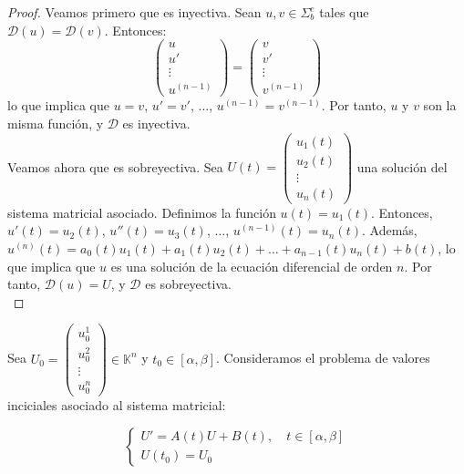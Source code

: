 \begin{proof}
    Veamos primero que es inyectiva. Sean $u, v \in \Sigma_b^e$ tales que $\mathcal{D}(u) = \mathcal{D}(v)$. Entonces:
    \[
        \begin{pmatrix}
            u \\
            u' \\
            \vdots \\
            u^{(n-1)}
        \end{pmatrix} = \begin{pmatrix}
            v \\
            v' \\
            \vdots \\
            v^{(n-1)}
        \end{pmatrix}
    \]
    lo que implica que $u = v$, $u' = v'$, $\ldots$, $u^{(n-1)} = v^{(n-1)}$. Por tanto, $u$ y $v$ son la misma función, y $\mathcal{D}$ es inyectiva.\\
    Veamos ahora que es sobreyectiva. Sea $U(t) = \begin{pmatrix}
        u_1(t) \\
        u_2(t) \\
        \vdots \\
        u_n(t)
    \end{pmatrix}$ una solución del sistema matricial asociado. Definimos la función $u(t) = u_1(t)$. Entonces, $u'(t) = u_2(t)$, $u''(t) = u_3(t)$, $\ldots$, $u^{(n-1)}(t) = u_n(t)$. Además, $u^{(n)}(t) = a_0(t) u_1(t) + a_1(t) u_2(t) + \ldots + a_{n-1}(t) u_n(t) + b(t)$, lo que implica que $u$ es una solución de la ecuación diferencial de orden $n$. Por tanto, $\mathcal{D}(u) = U$, y $\mathcal{D}$ es sobreyectiva.\\
\end{proof}

    Sea $U_0 = \begin{pmatrix}
        u_0^1 \\
        u_0^2 \\
        \vdots \\
        u_0^n
    \end{pmatrix} \in \mathbb{K}^n$ y $t_0 \in [\alpha, \beta]$. Consideramos el problema de valores inciciales asociado al sistema matricial:

    \[
        \begin{cases}
            U' = A(t) U + B(t), \quad t \in [\alpha, \beta] \\
            U(t_0) = U_0
        \end{cases}
    \]

